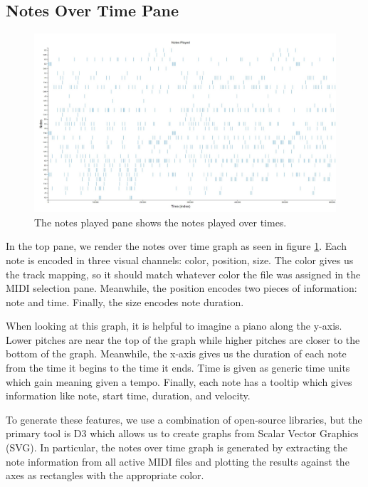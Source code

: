\documentclass[journal]{vgtc}                %
\begin{document}
\subsection{Notes Over Time Pane}

\begin{figure}[h]
  \centering
  \includegraphics[width=\columnwidth]{notes-played-single-track}
  \caption{The notes played pane shows the notes played over times.}
  \label{fig:notes-played}
\end{figure}

In the top pane, we render the notes over time graph as seen in figure
\ref{fig:notes-played}. Each note is encoded in three visual channels: color,
position, size. The color gives us the track mapping, so it should match
whatever color the file was assigned in the MIDI selection pane. Meanwhile, the
position encodes two pieces of information: note and time. Finally, the size
encodes note duration.

When looking at this graph, it is helpful to imagine a piano along the y-axis.
Lower pitches are near the top of the graph while higher pitches are closer to the
bottom of the graph. Meanwhile, the x-axis gives us the duration of each note
from the time it begins to the time it ends. Time is given as generic time units
which gain meaning given a tempo. Finally, each note has a tooltip which gives
information like note, start time, duration, and velocity.

To generate these features, we use a combination of open-source libraries, but
the primary tool is D3 which allows us to create graphs from Scalar Vector
Graphics (SVG). In particular, the notes over time graph is generated by
extracting the note information from all active MIDI files and plotting the
results against the axes as rectangles with the appropriate color.
\end{document}
